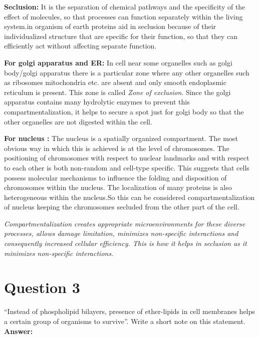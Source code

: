 \documentclass[11pt]{scrartcl}
\begin{document}
		\textbf{Seclusion: }It is the separation of chemical  pathways and the specificity of the effect of molecules, so that processes can function separately within the living system.in organism of earth proteins aid in seclusion because of their individualized structure that are specific for their function, so that they can efficiently act without affecting separate function.
		
		\textbf{For golgi apparatus and ER: }In cell near some organelles such as golgi body/golgi apparatus there is a particular zone where any other organelles such as ribosomes mitochondria etc. are absent and only smooth endoplasmic reticulum is present. This zone is called \emph{Zone of exclusion}. Since the golgi apparatus contains many hydrolytic enzymes to prevent this compartmentalization, it helps to secure a spot just for  golgi body so that the other organelles are not digested within the cell.
		
		\textbf{For nucleus : }The nucleus is a spatially organized compartment. The most obvious way in which this is achieved is at the level of chromosomes. The positioning of chromosomes with respect to nuclear landmarks and with respect to each other is both non-random and cell-type specific. This suggests that cells possess molecular mechanisms to influence the folding and disposition of chromosomes within the nucleus. The localization of many proteins is also heterogeneous within the nucleus.So this can be considered compartmentalization of nucleus keeping the chromosomes secluded from the other part of the cell.
		
		\emph{Compartmentalization creates appropriate microenvironments for these diverse processes, allows damage limitation, minimizes non-specific interactions and consequently increased cellular efficiency. This is how it helps in seclusion as it minimizes non-specific interactions.} \cite{Dan} \cite{TKS}
		
		\pagebreak
		
		\section{Question 3}
		
		“Instead of phospholipid bilayers, presence of ether-lipids in cell membranes helps a certain group of organisms to survive”. Write a short note on this statement.\\[2pt]
		
		\textbf{Answer:}\\[2pt]
		
\end{document}
